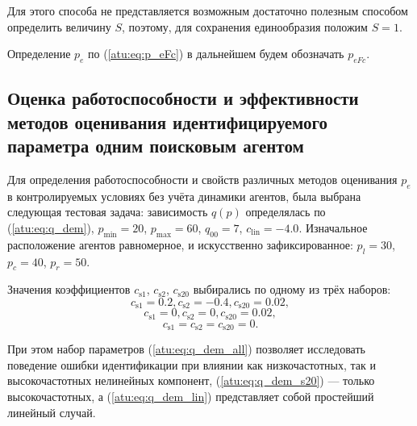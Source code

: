 Для этого способа не представляется возможным
достаточно полезным способом определить величину $S$,
поэтому, для сохранения единообразия положим $S=1$.

Определение $p_e$ по (\ref{atu:eq:p_eFc}) в дальнейшем будем обозначать $p_{eFc}$.




\subsection{Оценка работоспособности и эффективности методов оценивания идентифицируемого параметра одним поисковым агентом}  %

Для определения работоспособности и свойств различных методов оценивания $p_e$
в контролируемых условиях без учёта динамики агентов, была выбрана следующая
тестовая задача: зависимость $q(p)$ определялась по (\ref{atu:eq:q_dem}),
$p_{\min}=20$, $p_{\max}=60$,
$q_{00}=7$, $c_\mathrm{lin}=-4.0$.
Изначальное расположение агентов равномерное, и искусственно  зафиксированное:
$p_l=30$, $p_c=40$,  $p_r=50$.

Значения коэффициентов
$c_\mathrm{s1}$, $c_\mathrm{s2}$, $c_\mathrm{s20}$
выбирались по одному из трёх наборов:
%
\begin{equation}
  c_\mathrm{s1} = 0.2, c_\mathrm{s2} = -0.4, c_\mathrm{s20} = 0.02,
  \label{atu:eq:q_dem_all}
\end{equation}
%
\begin{equation}
  c_\mathrm{s1} = 0, c_\mathrm{s2} = 0, c_\mathrm{s20} = 0.02,
  \label{atu:eq:q_dem_s20}
\end{equation}
%
\begin{equation}
  c_\mathrm{s1} = c_\mathrm{s2} = c_\mathrm{s20} = 0 .
  \label{atu:eq:q_dem_lin}
\end{equation}

При этом набор параметров (\ref{atu:eq:q_dem_all})
позволяет исследовать поведение ошибки идентификации при
влиянии как низкочастотных, так и высокочастотных
нелинейных компонент,
(\ref{atu:eq:q_dem_s20}) --- только высокочастотных,
а (\ref{atu:eq:q_dem_lin}) представляет собой
простейший линейный случай.

